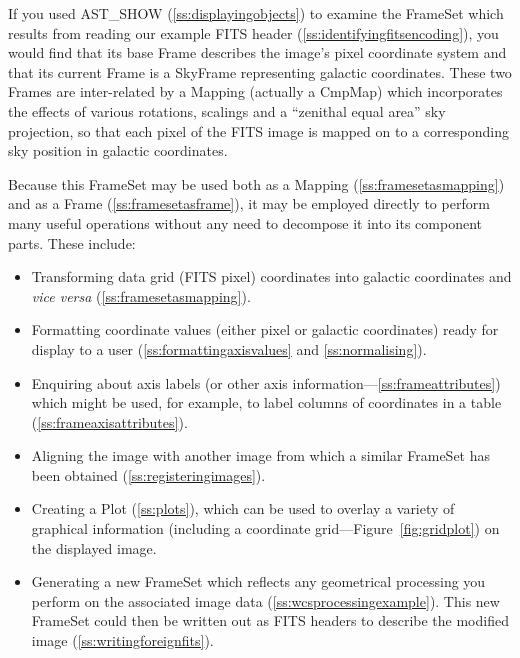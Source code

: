 \documentclass[twoside,11pt]{article}
\newcommand{\htmlref}[2]{#1}
\newcommand{\secref}[1]{\S\ref{#1}}
\renewcommand{\secref}[1]{\ref{#1}}
\begin{document}
If you used \htmlref{AST\_SHOW}{AST_SHOW} (\secref{ss:displayingobjects}) to examine the
FrameSet which results from reading our example FITS header
(\secref{ss:identifyingfitsencoding}), you would find that its base
\htmlref{Frame}{Frame} describes the image's pixel coordinate system and that its
current Frame is a \htmlref{SkyFrame}{SkyFrame} representing galactic coordinates. These
two Frames are inter-related by a \htmlref{Mapping}{Mapping} (actually a \htmlref{CmpMap}{CmpMap}) which
incorporates the effects of various rotations, scalings and a
``zenithal equal area'' sky projection, so that each pixel of the FITS
image is mapped on to a corresponding sky position in galactic
coordinates.

Because this FrameSet may be used both as a Mapping
(\secref{ss:framesetasmapping}) and as a Frame
(\secref{ss:framesetasframe}), it may be employed directly to perform
many useful operations without any need to decompose it into its
component parts. These include:

\begin{itemize}
\item Transforming data grid (FITS pixel) coordinates into galactic
coordinates and {\em{vice versa}} (\secref{ss:framesetasmapping}).

\item Formatting coordinate values (either pixel or galactic
coordinates) ready for display to a user
(\secref{ss:formattingaxisvalues} and \secref{ss:normalising}).

\item Enquiring about axis labels (or other axis
information---\secref{ss:frameattributes}) which might be used, for
example, to label columns of coordinates in a table
(\secref{ss:frameaxisattributes}).

\item Aligning the image with another image from which a similar
FrameSet has been obtained (\secref{ss:registeringimages}).

\item Creating a \htmlref{Plot}{Plot} (\secref{ss:plots}), which can be used to overlay
a variety of graphical information (including a coordinate
grid---Figure~\ref{fig:gridplot}) on the displayed image.

\item Generating a new FrameSet which reflects any geometrical
processing you perform on the associated image data
(\secref{ss:wcsprocessingexample}). This new FrameSet could then be
written out as FITS headers to describe the modified image
(\secref{ss:writingforeignfits}).
\end{itemize}
\end{document}
